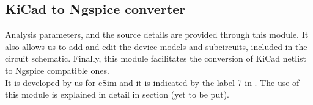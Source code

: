 \subsection{KiCad to Ngspice converter}
Analysis parameters, and the source details are provided through this module. It also allows us to add and edit the device models and subcircuits, included in the circuit schematic.  Finally, this module facilitates the conversion of KiCad netlist to Ngspice compatible ones. 
\\
It is developed by us for eSim and it is indicated by the label 7 in . The use of this module is explained in detail in section (yet to be put).


